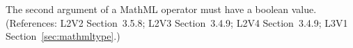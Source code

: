 The second argument of a MathML  operator must have
a boolean value.  (References: L2V2 Section~3.5.8; L2V3 Section~3.4.9;
L2V4 Section~3.4.9; L3V1 Section~\ref{sec:mathmltype}.)
